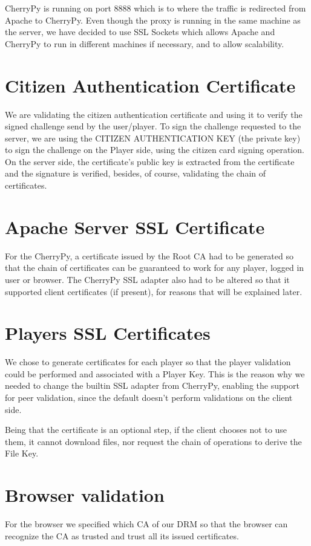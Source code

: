 \documentclass[11pt,a4paper]{report}
\begin{document}
CherryPy is running on port 8888 which is to where the traffic is redirected from Apache to CherryPy. Even though the proxy is running in the same machine as the server, we have decided to use SSL Sockets which allows Apache and CherryPy to run in different machines if necessary, and to allow scalability.

\section{Citizen Authentication Certificate}

We are validating the citizen authentication certificate and using it to verify the signed challenge send by the user/player.
To sign the challenge requested to the server, we are using the CITIZEN AUTHENTICATION KEY (the private key) to sign the challenge on the Player side, using the citizen card signing operation.
On the server side, the certificate's public key is extracted from the certificate and the signature is verified, besides, of course, validating the chain of certificates.

\section{Apache Server SSL Certificate}

For the CherryPy, a certificate issued by the Root CA had to be generated so that the chain of certificates can be guaranteed to work for any player, logged in user or browser. The CherryPy SSL adapter also had to be altered so that it supported client certificates (if present), for reasons that will be explained later.

\section{Players SSL Certificates}

We chose to generate certificates for each player so that the player validation could be performed and associated with a Player Key. This is the reason why we needed to change the builtin SSL adapter from CherryPy, enabling the support for peer validation, since the default doesn't perform validations on the client side.

Being that the certificate is an optional step, if the client chooses not to use them, it cannot download files, nor request the chain of operations to derive the File Key.

\section{Browser validation}
For the browser we specified which CA of our DRM so that the browser can recognize the CA as trusted and trust all its issued certificates.
\end{document}
